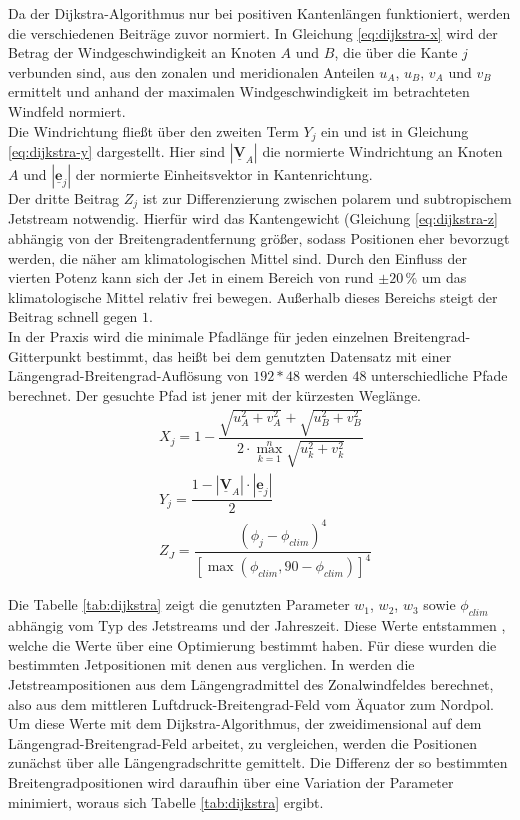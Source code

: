 Da der Dijkstra-Algorithmus nur bei positiven Kantenlängen funktioniert, werden die verschiedenen Beiträge zuvor normiert. In Gleichung \ref{eq:dijkstra-x} wird der Betrag der Windgeschwindigkeit an Knoten $A$ und $B$, die über die Kante $j$ verbunden sind, aus den zonalen und meridionalen Anteilen $u_A$, $u_B$, $v_A$ und $v_B$ ermittelt und anhand der maximalen Windgeschwindigkeit im betrachteten Windfeld normiert.
\\
Die Windrichtung fließt über den zweiten Term $Y_j$ ein und ist in Gleichung \ref{eq:dijkstra-y} dargestellt. Hier sind $|\underline{\boldsymbol{V}}_A|$ die normierte Windrichtung an Knoten $A$ und $|\underline{\boldsymbol{e}}_j|$ der normierte Einheitsvektor in Kantenrichtung.
\\
Der dritte Beitrag $Z_j$ ist zur Differenzierung zwischen polarem und subtropischem Jetstream notwendig. Hierfür wird das Kantengewicht (Gleichung \ref{eq:dijkstra-z} abhängig von der Breitengradentfernung größer, sodass Positionen eher bevorzugt werden, die näher am klimatologischen Mittel sind. Durch den Einfluss der  vierten Potenz kann sich der Jet in einem Bereich von rund $\pm 20\,\%$ um das klimatologische Mittel relativ frei bewegen. Außerhalb dieses Bereichs steigt der Beitrag schnell gegen $1$.
\\
In der Praxis wird die minimale Pfadlänge für jeden einzelnen Breitengrad-Gitterpunkt bestimmt, das heißt bei dem genutzten Datensatz mit einer Längengrad-Breitengrad-Auflösung von $192 \ast 48$ werden $48$ unterschiedliche Pfade berechnet. Der gesuchte Pfad ist jener mit der kürzesten Weglänge.
\begin{align}
  & X_j = 1 - \dfrac{\sqrt{u_A^2 + v_A^2} + \sqrt{u_B^2 + v_B^2}}{2 \cdot \max_{k=1}^n  \sqrt{u_k^2 + v_k^2}}  
  \label{eq:dijkstra-x}\\
  & Y_j = \dfrac{1 - |\underline{\boldsymbol{V}}_A| \cdot |\underline{\boldsymbol{e}}_j|}{2} 
  \label{eq:dijkstra-y}\\
  & Z_J = \dfrac{\left( \phi_j - \phi_{clim} \right)^4}{\left[ \max \left( \phi_{clim}, 90 - \phi_{clim} \right) \right]^4}
  \label{eq:dijkstra-z}
\end{align}

Die Tabelle \ref{tab:dijkstra} zeigt die genutzten Parameter $w_1$, $w_2$, $w_3$ sowie $\phi_{clim}$ abhängig vom Typ des Jetstreams und der Jahreszeit. Diese Werte entstammen \citet{molnos-2017}, welche die Werte über eine Optimierung bestimmt haben. Für diese wurden die bestimmten Jetpositionen mit denen aus \citet{rikus-2015} verglichen. In \citet{rikus-2015} werden die Jetstreampositionen aus dem Längengradmittel des Zonalwindfeldes berechnet, also aus dem mittleren Luftdruck-Breitengrad-Feld vom Äquator zum Nordpol. Um diese Werte mit dem Dijkstra-Algorithmus, der zweidimensional auf dem Längengrad-Breitengrad-Feld arbeitet, zu vergleichen, werden die Positionen zunächst über alle Längengradschritte gemittelt. Die Differenz der so bestimmten Breitengradpositionen wird daraufhin über eine Variation der Parameter minimiert, woraus sich Tabelle \ref{tab:dijkstra} ergibt.

